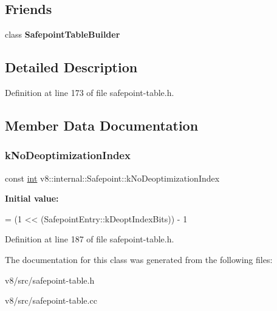 \subsection*{Friends}
\begin{DoxyCompactItemize}
\item 
\mbox{\label{classv8_1_1internal_1_1Safepoint_a2d6731928ba3d3e308c38b4cbd451264}} 
class {\bfseries Safepoint\+Table\+Builder}
\end{DoxyCompactItemize}


\subsection{Detailed Description}


Definition at line 173 of file safepoint-\/table.\+h.



\subsection{Member Data Documentation}
\mbox{\label{classv8_1_1internal_1_1Safepoint_aa4ba2afdb5b2fa7fe2708c7b10b75df7}} 
\subsubsection{\texorpdfstring{k\+No\+Deoptimization\+Index}{kNoDeoptimizationIndex}}
{\footnotesize\ttfamily const \mbox{\hyperlink{classint}{int}} v8\+::internal\+::\+Safepoint\+::k\+No\+Deoptimization\+Index\hspace{0.3cm}{\ttfamily [static]}}

{\bfseries Initial value\+:}
\begin{DoxyCode}
=
      (1 << (SafepointEntry::kDeoptIndexBits)) - 1
\end{DoxyCode}


Definition at line 187 of file safepoint-\/table.\+h.



The documentation for this class was generated from the following files\+:\begin{DoxyCompactItemize}
\item 
v8/src/safepoint-\/table.\+h\item 
v8/src/safepoint-\/table.\+cc\end{DoxyCompactItemize}
